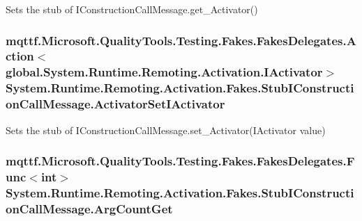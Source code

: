 Sets the stub of I\-Construction\-Call\-Message.\-get\-\_\-\-Activator()

\hypertarget{class_system_1_1_runtime_1_1_remoting_1_1_activation_1_1_fakes_1_1_stub_i_construction_call_message_a8745f091b8f45bd5f4ac17a586e735ad}{
\subsubsection[{Activator\-Set\-I\-Activator}]{\setlength{\rightskip}{0pt plus 5cm}mqttf.\-Microsoft.\-Quality\-Tools.\-Testing.\-Fakes.\-Fakes\-Delegates.\-Action$<$global.\-System.\-Runtime.\-Remoting.\-Activation.\-I\-Activator$>$ System.\-Runtime.\-Remoting.\-Activation.\-Fakes.\-Stub\-I\-Construction\-Call\-Message.\-Activator\-Set\-I\-Activator}}\label{class_system_1_1_runtime_1_1_remoting_1_1_activation_1_1_fakes_1_1_stub_i_construction_call_message_a8745f091b8f45bd5f4ac17a586e735ad}


Sets the stub of I\-Construction\-Call\-Message.\-set\-\_\-\-Activator(\-I\-Activator value)

\hypertarget{class_system_1_1_runtime_1_1_remoting_1_1_activation_1_1_fakes_1_1_stub_i_construction_call_message_a025a060e275213677132a6635a20cf29}{
\subsubsection[{Arg\-Count\-Get}]{\setlength{\rightskip}{0pt plus 5cm}mqttf.\-Microsoft.\-Quality\-Tools.\-Testing.\-Fakes.\-Fakes\-Delegates.\-Func$<$int$>$ System.\-Runtime.\-Remoting.\-Activation.\-Fakes.\-Stub\-I\-Construction\-Call\-Message.\-Arg\-Count\-Get}}\label{class_system_1_1_runtime_1_1_remoting_1_1_activation_1_1_fakes_1_1_stub_i_construction_call_message_a025a060e275213677132a6635a20cf29}


